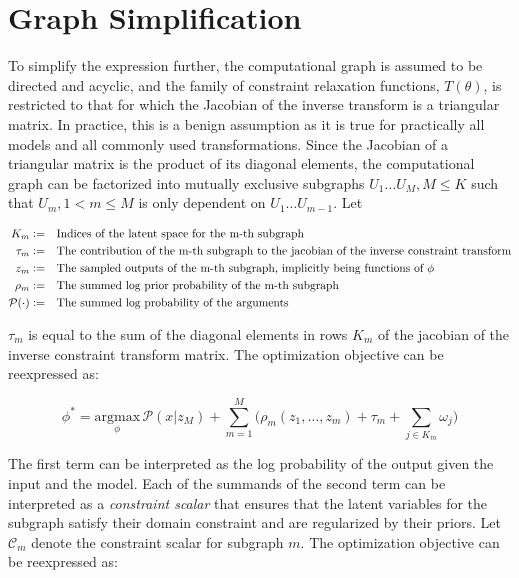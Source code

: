 \documentclass[10pt]{article}
\newcommand{\defeq}{\vcentcolon=}
\begin{document}
\section*{Graph Simplification}

To simplify the expression further, the computational graph is assumed to be directed and acyclic, and the family of 
constraint relaxation functions, $T(\theta)$, is restricted to that for which the Jacobian of the inverse transform is 
a triangular matrix. In practice, this is a benign assumption as it is true for practically all models and all commonly used 
transformations. Since the Jacobian of a triangular matrix is the product of its diagonal elements, 
the computational graph can be factorized into mutually exclusive subgraphs $U_1 \ldots U_M, M \leq K$ such that 
$U_m, 1 < m \leq M$ is only dependent on $U_1 \ldots U_{m - 1}$. Let

\begin{align*}
  K_m \defeq&\quad \text{Indices of the latent space for the m-th subgraph} \\
  \tau_m \defeq&\quad \text{The contribution of the m-th subgraph to the jacobian of the inverse constraint transform} \\
  z_m \defeq&\quad \text{The sampled outputs of the m-th subgraph, implicitly being functions of $\phi$} \\
  \rho_m \defeq&\quad \text{The summed log prior probability of the m-th subgraph} \\
  \mathcal{P}(\cdot) \defeq&\quad \text{The summed log probability of the arguments}
\end{align*}

$\tau_m$ is equal to the sum of the diagonal elements in rows $K_m$ of the jacobian of the inverse constraint transform matrix. The optimization 
objective can be reexpressed as:

\begin{equation*}
  \phi^* = \underset{\phi}{\text{argmax}} \, \mathcal{P}(x | z_M) + \sum_{m=1}^{M}\Big(\rho_m(z_1, \ldots, z_m ) + \tau_m + \sum_{j \in K_m}\omega_j \Big)
\end{equation*}

The first term can be interpreted as the log probability of the output given the input and the model. Each of the summands of the
second term can be interpreted as a \textit{constraint scalar} that ensures that the latent variables for the subgraph satisfy their 
domain constraint and are regularized by their priors. Let $\mathcal{C}_m$ denote the constraint scalar for subgraph $m$. The optimization
objective can be reexpressed as:
\end{document}
